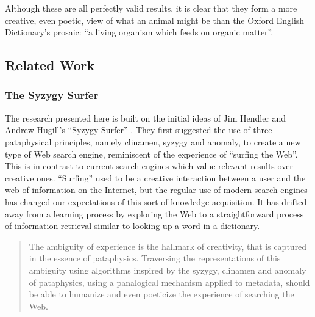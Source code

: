 Although these are all perfectly valid results, it is clear that they form a more creative, even poetic, view of what an animal might be than the Oxford English Dictionary's prosaic: ``a living organism which feeds on organic matter''.



\subsection{Related Work}

\subsubsection*{The Syzygy Surfer}

The research presented here is built on the initial ideas of Jim Hendler and Andrew Hugill's ``Syzygy Surfer'' \autocite{Hendler2011, Hendler2013}. They first suggested the use of three pataphysical principles, namely clinamen, syzygy and anomaly, to create a new type of Web search engine, reminiscent of the experience of ``surfing the Web''. This is in contrast to current search engines which value relevant results over creative ones. ``Surfing'' used to be a creative interaction between a user and the web of information on the Internet, but the regular use of modern search engines has changed our expectations of this sort of knowledge acquisition. It has drifted away from a learning process by exploring the Web to a straightforward process of information retrieval similar to looking up a word in a dictionary.

\begin{quote}
  The ambiguity of experience is the hallmark of creativity, that is captured in the essence of pataphysics. Traversing the representations of this ambiguity using algorithms inspired by the syzygy, clinamen and anomaly of pataphysics, using a panalogical mechanism applied to metadata, should be able to humanize and even poeticize the experience of searching the Web.\autocite{Hendler2013}
\end{quote}

